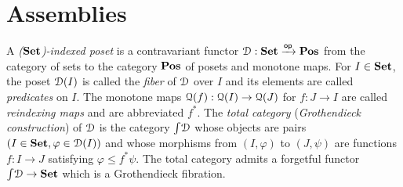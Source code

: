 \section{Assemblies}

A \emph{(${\mathbf{Set}}$)-indexed poset} is a contravariant functor
$\EuScript{D}:{\mathbf{Set}}\xrightarrow{\mathsf{op}}\mathbf{Pos}$ from the category of sets to the category $\mathbf{Pos}$ of
posets and monotone maps. For $I\in{\mathbf{Set}}$, the poset
$\EuScript{D}(I)$ is called the \emph{fiber} of $\EuScript{D}$ over $I$ and its elements are
called \emph{predicates} on $I$. The monotone maps
${\EuScript{Q}}(f):{\EuScript{Q}}(I)\to{\EuScript{Q}}(J)$ for $f:J\to I$ are called \emph{reindexing maps}
and are abbreviated $f^*$. The \emph{total category} (\aka \emph{Grothendieck
construction}) of $\EuScript{D}$ is the category $\textstyle\int\!\EuScript{D}$ whose objects are pairs
$(I\in{\mathbf{Set}},\varphi\in\EuScript{D}(I))$ and whose morphisms from $(I,\varphi)$ to
$(J,\psi)$ are functions $f:I\to J$ satisfying $\varphi\leq f^*\psi$.
The total category admits a forgetful functor $\textstyle\int\!\EuScript{D}\to{\mathbf{Set}}$ which is a
Grothendieck fibration.



